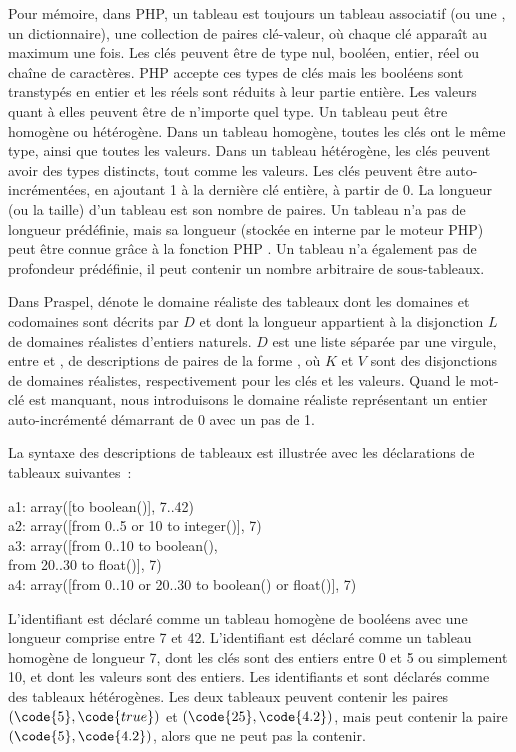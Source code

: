 Pour mémoire, dans PHP, un tableau est toujours un {\strong tableau associatif}
(ou une , un dictionnaire), \ie une collection de paires
clé-valeur, où chaque clé apparaît au maximum une fois. Les clés peuvent être de
type nul, booléen, entier, réel ou chaîne de caractères. PHP accepte ces types
de clés mais les booléens sont transtypés en entier et les réels sont réduits à
leur partie entière. Les valeurs quant à elles peuvent être de n'importe quel
type. Un tableau peut être {\strong homogène} ou {\strong hétérogène}. Dans un
tableau homogène, toutes les clés ont le même type, ainsi que toutes les
valeurs. Dans un tableau hétérogène, les clés peuvent avoir des types distincts,
tout comme les valeurs. Les clés peuvent être auto-incrémentées, en ajoutant 1 à
la dernière clé entière, à partir de 0. La longueur (ou la taille) d'un tableau
est son nombre de paires. Un tableau n'a pas de longueur prédéfinie, mais sa
longueur (stockée en interne par le moteur PHP) peut être connue grâce à la
fonction PHP . Un tableau n'a également pas de profondeur
prédéfinie, \ie il peut contenir un nombre arbitraire de sous-tableaux.

Dans Praspel,  dénote le domaine réaliste des tableaux
dont les domaines et codomaines sont décrits par $D$ et dont la longueur
appartient à la disjonction $L$ de domaines réalistes d'entiers naturels.  $D$
est une liste séparée par une virgule, entre \code{[} et \code{]}, de {\strong
descriptions} de paires de la forme , où $K$ et $V$ sont
des disjonctions de domaines réalistes, respectivement pour les clés et les
valeurs. Quand le mot-clé  est manquant, nous introduisons le domaine
réaliste représentant un entier auto-incrémenté démarrant de 0 avec un pas de 1.

\begin{example}

La syntaxe des descriptions de tableaux est illustrée avec les déclarations de
tableaux suivantes~:
%
\begin{pre}
a1: array([to boolean()], 7..42) \\
a2: array([from 0..5 or 10 to integer()], 7) \\
a3: array([from 0..10 to boolean(), \\
           from 20..30 to float()], 7) \\
a4: array([from 0..10 or 20..30 to boolean() or float()], 7)
\end{pre}
%
L'identifiant  est déclaré comme un tableau homogène de booléens avec
une longueur comprise entre 7 et 42. L'identifiant  est déclaré comme
un tableau homogène de longueur 7, dont les clés sont des entiers entre 0 et 5
ou simplement 10, et dont les valeurs sont des entiers. Les identifiants
 et  sont déclarés comme des tableaux hétérogènes. Les deux
tableaux peuvent contenir les paires $(\code{5}, \code{true})$ et $(\code{25},
\code{4.2})$, mais  peut contenir la paire $(\code{5}, \code{4.2})$,
alors que  ne peut pas la contenir.

\end{example}

